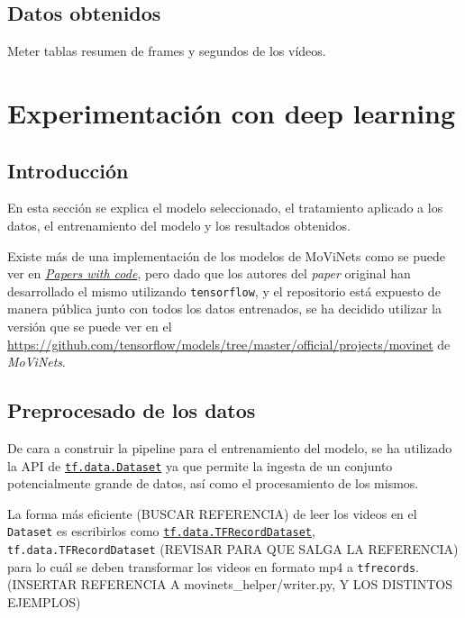 \subsection{Datos obtenidos}

Meter tablas resumen de frames y segundos de los vídeos.



\section{Experimentación con deep learning}

\subsection{Introducción}

En esta sección se explica el modelo seleccionado, el tratamiento aplicado a los datos, el entrenamiento del modelo y los resultados obtenidos.

Existe más de una implementación de los modelos de MoViNets como se puede ver en \href{https://paperswithcode.com/paper/movinets-mobile-video-networks-for-efficient}{\textit{Papers with code}}, pero dado que los autores del \textit{paper} original han desarrollado el mismo utilizando \texttt{tensorflow}, y el repositorio está expuesto de manera pública junto con todos los datos entrenados, se ha decidido utilizar la versión que se puede ver en el \href{repositorio oficial}{https://github.com/tensorflow/models/tree/master/official/projects/movinet} de \textit{MoViNets}.

\subsection{Preprocesado de los datos}

De cara a construir la pipeline para el entrenamiento del modelo, se ha utilizado la API de \href{https://www.tensorflow.org/api_docs/python/tf/data/Dataset}{\texttt{tf.data.Dataset}} ya que permite la ingesta de un conjunto potencialmente grande de datos, así como el procesamiento de los mismos.

La forma más eficiente (BUSCAR REFERENCIA) de leer los videos en el \texttt{Dataset} es escribirlos como \href{https://www.tensorflow.org/api_docs/python/tf/data/TFRecordDataset}{\texttt{tf.data.TFRecordDataset}}, 
\texttt{tf.data.TFRecordDataset}
(REVISAR PARA QUE SALGA LA REFERENCIA)
para lo cuál se deben transformar los videos en formato mp4 a \texttt{tfrecords}. (INSERTAR REFERENCIA A movinets\_helper/writer.py, Y LOS DISTINTOS EJEMPLOS)

